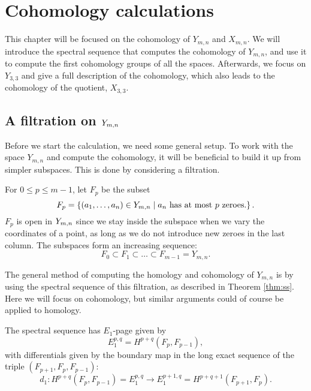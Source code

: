 


\chapter{Cohomology calculations}
\label{chap:udregninger}

This chapter will be focused on the cohomology of $Y_{m,n}$ and
$X_{m,n}$. We will introduce the spectral sequence that computes the
cohomology of $Y_{m,n}$, and use it to compute the first cohomology
groups of all the spaces. Afterwards, we focus on $Y_{3,3}$ and give a
full description of the cohomology, which also leads to the cohomology
of the quotient, $X_{3,3}$.

\section{A filtration on $Y_{m,n}$}
\label{sec:filtration}

Before we start the calculation, we need some general setup. To work
with the space $Y_{m,n}$ and compute the cohomology, it will
be beneficial to build it up from simpler subspaces. This is done by
considering a filtration.

For $0 \leq p \leq m-1$, let $F_p$ be the subset
\[ F_p=\left\{  (a_1,\dots,a_n) \in Y_{m,n} \mid a_n \text{ has at most } p
  \text{ zeroes}. \right\}. \]
$F_p$ is open in $Y_{m,n}$ since we stay inside the subspace when we
vary the coordinates of a point, as long as we do not
introduce new zeroes in the last column.
The subspaces form an increasing sequence:
\[ F_0 \subset F_1 \subset \dots \subset F_{m-1} = Y_{m,n}. \]

The general method of computing the homology and cohomology of
$Y_{m,n}$ is by using the spectral sequence of this
filtration, as described in Theorem \ref{thm:ss}. Here we will focus on
cohomology, but similar arguments could of course be applied to
homology.

The spectral sequence has $E_1$-page given by
\[ E_1^{p,q} = H^{p+q}(F_p,F_{p-1}), \]
with differentials given by the boundary map in the long exact
sequence of the triple $(F_{p+1},F_p,F_{p-1})$:
\[ d_1 : H^{p+q}(F_p,F_{p-1}) = E_1^{p,q} \to E_1^{p+1,q} =
H^{p+q+1}(F_{p+1},F_p). \]

